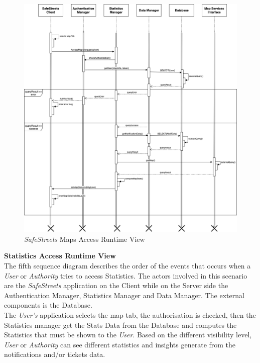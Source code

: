 \documentclass{article}
\begin{document}
	\begin{figure}[H]
			\centering
			\includegraphics[scale=0.33]{Images/Diagrams/Runtime/maps_runtime.png}
			\caption{{\it SafeStreets} Maps Access Runtime View}
	\end{figure}
	\pagebreak
	\noindent
	{\bf Statistics Access Runtime View} \\
	The fifth sequence diagram describes the order of the events that occurs when a {\it User} or {\it Authority} tries to access Statistics. The actors involved in this scenario are the {\it SafeStreets} application on the Client while on the Server side the Authentication Manager, Statistics Manager and Data Manager. The external components is the Database. \\ 
	The {\it User's} application selects the map tab, the authorisation is checked, then the Statistics manager get the Stats Data from the Database and computes the Statistics that must be shown to the {\it User}. Based on the different visibility level, {\it User} or {\it Authority} can see different statistics and insights generate from the notifications and/or tickets data.
\end{document}
